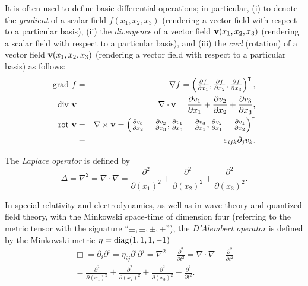 It is often used to define basic differential operations;
in particular, (i) to denote the {\em gradient} of a scalar field $f(x_1,x_2,x_3)$ (rendering a vector field with respect to a particular basis),
(ii) the {\em divergence} of a vector field ${\bf v}(x_1,x_2,x_3)$
(rendering a scalar field with respect to a particular basis), and
(iii) the {\em curl} (rotation) of a vector field  ${\bf v}(x_1,x_2,x_3)$ (rendering a vector field with respect to a particular basis)
as follows:
\begin{eqnarray}
\textrm{grad } f &=& \nabla f =\begin{pmatrix}
\frac{\partial f}{\partial x_1},
\frac{\partial f}{\partial x_2},
\frac{\partial f}{\partial x_3}
\end{pmatrix}^\intercal   ,\\
\textrm{div }  {\bf v} &=& \nabla \cdot {\bf v} =
\frac{\partial v_1}{\partial x_1}+
\frac{\partial v_2}{\partial x_2}+
\frac{\partial v_3}{\partial x_3}
  ,\\
\textrm{rot } {\bf v} &=& \nabla \times {\bf v} = \begin{pmatrix}
\frac{\partial v_3}{\partial x_2}-
\frac{\partial v_2}{\partial x_3}
,
\frac{\partial v_1}{\partial x_3}-
\frac{\partial v_3}{\partial x_1}
,
\frac{\partial v_2}{\partial x_1}-
\frac{\partial v_1}{\partial x_2}
\end{pmatrix}^\intercal           \\
&\equiv& \varepsilon_{ijk} \partial_j v_k.
\end{eqnarray}

The {\em Laplace operator}
is defined by
\begin{equation}
\Delta = \nabla^2= \nabla \cdot \nabla =
\frac{\partial^2 }{\partial (x_1)^2}+
\frac{\partial^2 }{\partial (x_2)^2}+
\frac{\partial^2 }{\partial (x_3)^2}
.
\end{equation}

In special relativity and electrodynamics,  as well as in  wave theory and quantized field theory, with the Minkowski space-time
of dimension four
(referring to the metric tensor with the signature ``$\pm ,\pm ,\pm ,\mp$''),
the {\em D'Alembert operator}
is defined by the Minkowski metric $\eta = {\rm diag} (1,1,1,-1)$
\begin{equation}
\begin{split}
\Box  = \partial_i \partial^i
=
\eta_{ij}  \partial^i \partial^j=
\nabla^2- \frac{\partial^2 }{\partial t^2}=
\nabla \cdot \nabla - \frac{\partial^2 }{\partial t^2}\\
=
\frac{\partial^2 }{\partial (x_1)^2}+
\frac{\partial^2 }{\partial (x_2)^2}+
\frac{\partial^2 }{\partial (x_3)^2}- \frac{\partial^2 }{\partial t^2}
.
\end{split}
\end{equation}

